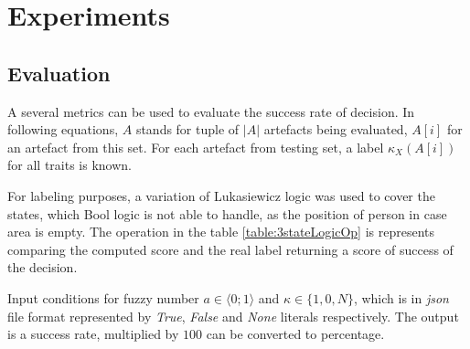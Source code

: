 





\chapter{Experiments}

\section{Evaluation}
\label{section:evaluationMetrics}
A several metrics can be used to evaluate the success rate of decision.
In following equations, $A$ stands for tuple of $|A|$ artefacts being
evaluated, $A[i]$ for an artefact from this set. For each artefact from testing
set, a label $\kappa_{X}(A[i])$ for all traits is known.

For labeling purposes, a variation of Lukasiewicz logic was used to cover
the states, which Bool logic is not able to handle, as the position of person
in case area is empty. The operation in the table \ref{table:3stateLogicOp} is
represents comparing the computed score and the real label returning a score
of success of the decision.

Input conditions for fuzzy number $a \in \langle 0;1 \rangle$
and $\kappa \in \{ 1, 0, N\}$, which is in {\it json} file format represented
by {\it True}, {\it False} and {\it None} literals respectively. The output
is a success rate, multiplied by $100$ can be converted to percentage.

